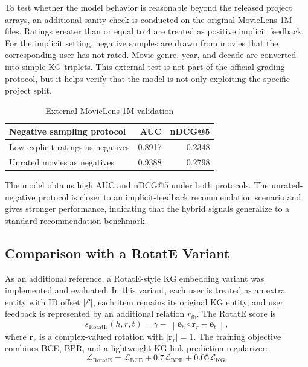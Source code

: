 \documentclass[onecolumn,a4paper,12pt]{IEEEtran}
\begin{document}
To test whether the model behavior is reasonable beyond the released project arrays, an additional sanity check is conducted on the original MovieLens-1M files. Ratings greater than or equal to 4 are treated as positive implicit feedback. For the implicit setting, negative samples are drawn from movies that the corresponding user has not rated. Movie genre, year, and decade are converted into simple KG triplets. This external test is not part of the official grading protocol, but it helps verify that the model is not only exploiting the specific project split.

\begin{table}[h]
\centering
\caption{External MovieLens-1M validation}
\begin{tabular}{lrr}
\toprule
Negative sampling protocol & AUC & nDCG@5 \\
\midrule
Low explicit ratings as negatives & 0.8917 & 0.2348 \\
Unrated movies as negatives & 0.9388 & 0.2798 \\
\bottomrule
\end{tabular}
\end{table}

The model obtains high AUC and nDCG@5 under both protocols. The unrated-negative protocol is closer to an implicit-feedback recommendation scenario and gives stronger performance, indicating that the hybrid signals generalize to a standard recommendation benchmark.

\subsection{Comparison with a RotatE Variant}

As an additional reference, a RotatE-style KG embedding variant was implemented and evaluated. In this variant, each user is treated as an extra entity with ID offset $|\mathcal{E}|$, each item remains its original KG entity, and user feedback is represented by an additional relation $r_{\mathrm{fb}}$. The RotatE score is
\begin{equation}
    s_{\mathrm{RotatE}}(h,r,t)
    =
    \gamma
    -
    \left\|
    \mathbf{e}_h \circ \mathbf{r}_r
    -
    \mathbf{e}_t
    \right\|,
\end{equation}
where $\mathbf{r}_r$ is a complex-valued rotation with $|\mathbf{r}_r|=1$. The training objective combines BCE, BPR, and a lightweight KG link-prediction regularizer:
\begin{equation}
    \mathcal{L}_{\mathrm{RotatE}}
    =
    \mathcal{L}_{\mathrm{BCE}}
    +
    0.7\mathcal{L}_{\mathrm{BPR}}
    +
    0.05\mathcal{L}_{\mathrm{KG}}.
\end{equation}
\end{document}
